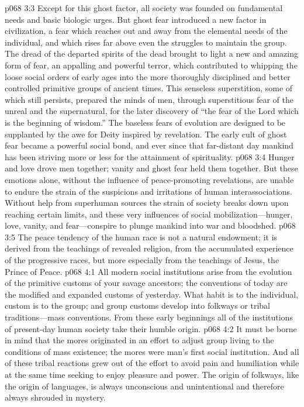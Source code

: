 \vs p068 3:3 Except for this ghost factor, all society was founded on fundamental needs and basic biologic urges. But ghost fear introduced a new factor in civilization, a fear which reaches out and away from the elemental needs of the individual, and which rises far above even the struggles to maintain the group. The dread of the departed spirits of the dead brought to light a new and amazing form of fear, an appalling and powerful terror, which contributed to whipping the loose social orders of early ages into the more thoroughly disciplined and better controlled primitive groups of ancient times. This senseless superstition, some of which still persists, prepared the minds of men, through superstitious fear of the unreal and the supernatural, for the later discovery of “the fear of the Lord which is the beginning of wisdom.” The baseless fears of evolution are designed to be supplanted by the awe for Deity inspired by revelation. The early cult of ghost fear became a powerful social bond, and ever since that far\hyp{}distant day mankind has been striving more or less for the attainment of spirituality.
\pc \vs p068 3:4 Hunger and love drove men together; vanity and ghost fear held them together. But these emotions alone, without the influence of peace\hyp{}promoting revelations, are unable to endure the strain of the suspicions and irritations of human interassociations. Without help from superhuman sources the strain of society breaks down upon reaching certain limits, and these very influences of social mobilization---hunger, love, vanity, and fear---conspire to plunge mankind into war and bloodshed.
\vs p068 3:5 The peace tendency of the human race is not a natural endowment; it is derived from the teachings of revealed religion, from the accumulated experience of the progressive races, but more especially from the teachings of Jesus, the Prince of Peace.
\vs p068 4:1 All modern social institutions arise from the evolution of the primitive customs of your savage ancestors; the conventions of today are the modified and expanded customs of yesterday. What habit is to the individual, custom is to the group; and group customs develop into folkways or tribal traditions---mass conventions. From these early beginnings all of the institutions of present\hyp{}day human society take their humble origin.
\vs p068 4:2 It must be borne in mind that the mores originated in an effort to adjust group living to the conditions of mass existence; the mores were man’s first social institution. And all of these tribal reactions grew out of the effort to avoid pain and humiliation while at the same time seeking to enjoy pleasure and power. The origin of folkways, like the origin of languages, is always unconscious and unintentional and therefore always shrouded in mystery.\plusone
